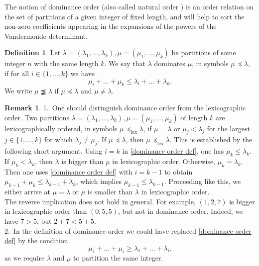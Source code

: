 \documentclass[letterpaper, DIV=17]{scrartcl}
\numberwithin{equation}{section}
\theoremstyle{definition}
\newtheorem{defn}{Definition}[section]
\newtheorem{rem}[theorem]{Remark}
\begin{document}
		
The notion of dominance order (also called natural order \cite{macdonald1995symmetric, stanley1989some}) is an order relation on the set of partitions of a given integer of fixed length, and will help to sort the non-zero coefficients appearing in the expansions of the powers of the Vandermonde determinant. 	
		\begin{defn}\label{def:dom}
		Let $\lambda=(\lambda_1, \dots, \lambda_k), \mu=(\mu_1, \dots, \mu_k)$ be partitions of some integer $n$ with the same length $k$. We say that $\lambda$ dominates $\mu$, in symbols $\mu \preceq \lambda$, if for all $i\in \{1, \dots, k \}$ we have
		\begin{equation} \label{dominance order def}
			\mu_i + \dots + \mu_k \leq \lambda_i + \dots  + \lambda_k.
		\end{equation}
		We write $\mu \precneqq \lambda$ if $\mu \preceq \lambda$ and $\mu \neq \lambda$. 
				\end{defn}
%
\begin{rem}				
1.~One should distinguish dominance order from the lexicographic order. Two partitions $\lambda=(\lambda_1, \dots, \lambda_k), \mu=(\mu_1, \dots, \mu_k)$ of length $ k $ are lexicographically ordered, in symbols $\mu \preceq_\mathrm{lex} \lambda$,  if $\mu=\lambda$ or $\mu_j <\lambda_j$ for the largest $j\in \{1, \dots, k\}$ for which $\lambda_j \neq \mu_j$. If $\mu \preceq \lambda$, then $\mu \preceq_\mathrm{lex} \lambda$. 
This is established by the following short argument. Using $i=k$ in \eqref{dominance order def}, one has $\mu_k\leq \lambda_k$. If $\mu_k< \lambda_k$, then $\lambda$ is bigger than $\mu$ in lexicographic order. Otherwise, $\mu_k = \lambda_k$. Then one uses \eqref{dominance order def} with $i=k-1$ to obtain $\mu_{k-1}+\mu_k \leq \lambda_{k-1}+\lambda_k$, which implies $\mu_{k-1}\leq \lambda_{k-1}$. Proceeding like this, we either arrive at $\mu = \lambda$ or $\mu$ is smaller than $\lambda$ in lexicographic order.\\
		The reverse implication does not hold in general. For example, $(1,2,7)$ is bigger in lexicographic order than $(0,5,5)$, but not in dominance order. Indeed, we have $7>5$, but $2+7<5+5$. \\
2.~In the definition of dominance order we could have replaced \eqref{dominance order def} by the condition 
	\begin{equation} \label{dominance order def 2}
		\mu_1 + \dots + \mu_i \geq \lambda_1 + \dots  + \lambda_i.
	\end{equation}
as we require $\lambda$ and $\mu$ to partition the same integer.
\end{rem}
\end{document}
